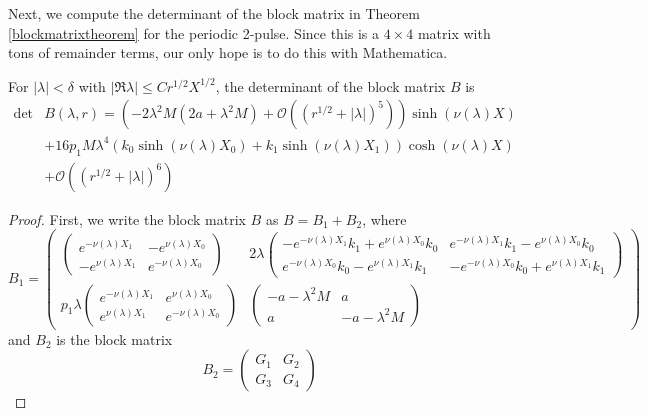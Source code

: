 \documentclass[thesis.tex]{subfiles}
\begin{document}
Next, we compute the determinant of the block matrix in Theorem \ref{blockmatrixtheorem} for the periodic 2-pulse. Since this is a $4\times 4$ matrix with tons of remainder terms, our only hope is to do this with Mathematica.

\begin{lemma}\label{2blockmatrix}
For $|\lambda| < \delta$ with $|\Re \lambda| \leq C r^{1/2}X^{1/2}$, the determinant of the block matrix $B$ is 
\begin{equation}\label{2detBeq}
\begin{aligned}
\det &B(\lambda, r) = \left(-2 \lambda^2 M (2a + \lambda^2 M) +  \mathcal{O}( (r^{1/2} + |\lambda|)^5 )\right) \sinh(\nu(\lambda)X) \\
&+16 p_1 M \lambda^4 ( k_0\sinh(\nu(\lambda)X_0) + k_1 \sinh(\nu(\lambda)X_1) ) \cosh(\nu(\lambda)X)  \\
&+ \mathcal{O}( (r^{1/2} + |\lambda|)^6) 
\end{aligned}
\end{equation}
\begin{proof}
First, we write the block matrix $B$ as $B = B_1 + B_2$, where
\[
B_1 = \begin{pmatrix}
\begin{pmatrix}
e^{-\nu(\lambda)X_1} & -e^{\nu(\lambda)X_0} \\
-e^{\nu(\lambda)X_1} & e^{-\nu(\lambda)X_0} 
\end{pmatrix} &
2 \lambda \begin{pmatrix}
-e^{-\nu(\lambda)X_1} k_1 + e^{\nu(\lambda)X_0} k_0 & e^{-\nu(\lambda)X_1} k_1 - e^{\nu(\lambda)X_0} k_0 \\ e^{-\nu(\lambda)X_0} k_0 - e^{\nu(\lambda)X_1} k_1 & -e^{-\nu(\lambda)X_0} k_0 + e^{\nu(\lambda)X_1} k_1
\end{pmatrix} \\
p_1 \lambda
\begin{pmatrix}
e^{-\nu(\lambda)X_1} & e^{\nu(\lambda)X_0} \\
e^{\nu(\lambda)X_1} & e^{-\nu(\lambda)X_0} 
\end{pmatrix} &
\begin{pmatrix}
-a - \lambda^2 M & a \\
a & -a - \lambda^2 M
\end{pmatrix}
\end{pmatrix}
\]
and $B_2$ is the block matrix 
\[
B_2 = \begin{pmatrix}
G_1 & G_2 \\ G_3 & G_4
\end{pmatrix}
\]
\end{proof}
\end{lemma}
\end{document}
